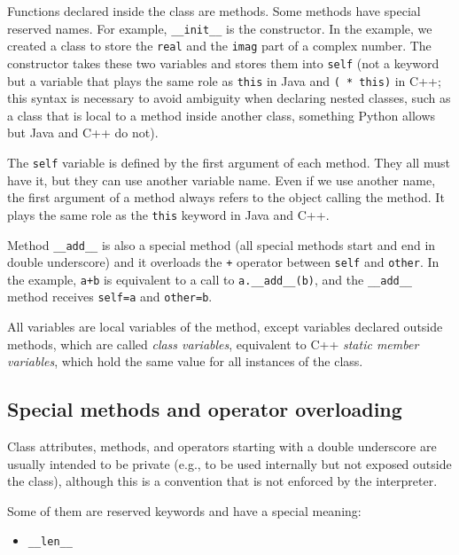 \documentclass[justified, sixbynine]{tufte-book}
\def\ft{\small\tt}
\theoremstyle{plain}%
\newtheorem * {corollary}{Corollary}
\theoremstyle{definition}
\theoremstyle{remark}
\newtheorem * {remark}{Remark}
\newtheorem * {note}{Note}
\begin{document}
\begin{fullwidth}
Functions declared inside the class are methods. Some methods have special reserved names. For example, {\ft \_\_init\_\_} is the constructor. In the example, we created a class to store the {\ft real} and the {\ft imag} part of a complex number. The constructor takes these two variables and stores them into {\ft self} (not a keyword but a variable that plays the same role as {\ft this} in Java and {\ft ( * this)} in C++;
this syntax is necessary to avoid ambiguity when declaring nested classes, such as a class that is local to a method inside another class, something Python allows but Java and C++ do not).

The {\ft self} variable is defined by the first argument of each method. They all must have it, but they can use another variable name. Even if we use another name, the first argument of a method always refers to the object calling the method. It plays the same role as the {\ft this} keyword in Java and C++.

Method {\ft \_\_add\_\_} is also a special method (all special methods start and end in double underscore) and it overloads the {\ft +} operator between {\ft self} and {\ft other}. In the example, {\ft a+b} is equivalent to a call to {\ft a.\_\_add\_\_(b)}, and the {\ft \_\_add\_\_} method receives {\ft self=a} and {\ft other=b}.

All variables are local variables of the method, except variables declared outside methods, which are called {\it class variables}, equivalent to C++ {\it static member variables}, which hold the same value for all instances of the class.

\goodbreak\subsection{Special methods and operator overloading}




Class attributes, methods, and operators starting with a double underscore are usually intended to be private (e.g., to be used internally but not exposed outside the class), although this is a convention that is not enforced by the interpreter.

Some of them are reserved keywords and have a special meaning:
\begin{itemize}
\item {\ft \_\_len\_\_}


\end{itemize}
\end{fullwidth}
\end{document}
